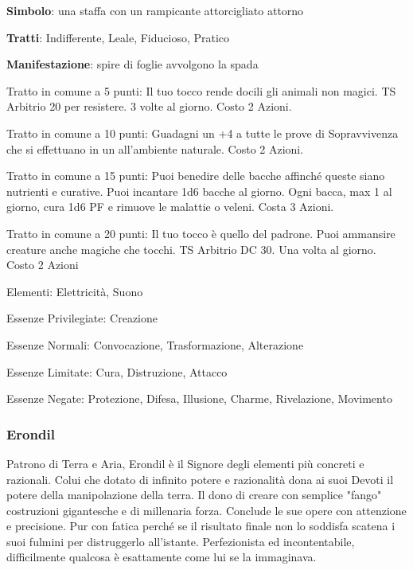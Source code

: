 \documentclass[a4paper,11pt,twoside,openany]{book}
\begin{document}
\textbf{Simbolo}: una staffa con un rampicante attorcigliato attorno

\textbf{Tratti}: Indifferente, Leale, Fiducioso, Pratico

\textbf{Manifestazione}: spire di foglie avvolgono la spada

\bigskip

Tratto in comune a 5 punti: Il tuo tocco rende docili gli animali non magici. TS Arbitrio 20 per resistere. 3 volte al giorno. Costo 2 Azioni.

Tratto in comune a 10 punti: Guadagni un +4 a tutte le prove di Sopravvivenza che si effettuano in un all'ambiente naturale. Costo 2 Azioni.

Tratto in comune a 15 punti: Puoi benedire delle bacche affinché queste siano nutrienti e curative. Puoi incantare 1d6 bacche al giorno. Ogni bacca, max 1 al giorno, cura 1d6 PF e rimuove le malattie o veleni. Costa 3 Azioni.

Tratto in comune a 20 punti: Il tuo tocco è quello del padrone. Puoi ammansire creature anche magiche che tocchi. TS Arbitrio DC 30. Una volta al giorno. Costo 2 Azioni

\bigskip

Elementi: Elettricità, Suono

\bigskip

Essenze Privilegiate: Creazione

Essenze Normali: Convocazione, Trasformazione, Alterazione

Essenze Limitate: Cura, Distruzione, Attacco

Essenze Negate: Protezione, Difesa, Illusione, Charme, Rivelazione, Movimento

\subsubsection{Erondil}

\label{erondil}

Patrono di Terra e Aria, Erondil è il Signore degli elementi più concreti e razionali. Colui che dotato di infinito potere e razionalità dona ai suoi Devoti il potere della manipolazione della terra. Il dono di creare con semplice "fango" costruzioni gigantesche e di millenaria forza. Conclude le sue opere con attenzione e precisione.
Pur con fatica perché se il risultato finale non lo soddisfa scatena i suoi fulmini per distruggerlo all'istante. Perfezionista ed incontentabile, difficilmente qualcosa è esattamente come lui se la immaginava.
\end{document}
